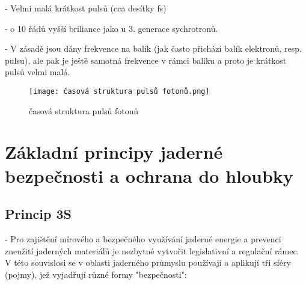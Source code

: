 - Velmi malá krátkost pulsů (cca desítky fs)

- o 10 řádů vyšší briliance jako u 3. generace sychrotronů. 

- V zásadě jsou dány frekvence na balík (jak často přichází balík elektronů, resp. pulsu), ale pak je ještě samotná frekvence v rámci balíku a proto je krátkost pulsů velmi malá.

\begin{figure}[ht!]
    \centering
    \texttt{[image: časová struktura pulsů fotonů.png]}
    \caption{časová struktura pulsů fotonů}
\end{figure}

\newpage
























\newpage
\section{Základní principy jaderné bezpečnosti a ochrana do hloubky}

\subsection{Princip 3S}
- Pro zajištění mírového a bezpečného využívání jaderné energie a prevenci zneužití jaderných materiálů je nezbytné vytvořit legislativní a regulační rámec. V této souvislosi se v oblasti jaderného průmyslu používají a aplikují tři sféry (pojmy), jež vyjadřují různé formy "bezpečnosti":

